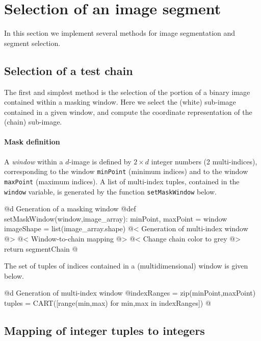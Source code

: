 \documentclass[11pt,oneside]{article}	%
\begin{document}
\section{Selection of an image segment}

In this section we implement several methods for image segmentation and segment selection. 

\subsection{Selection of a test chain}

The first and simplest method is the selection of the portion of a binary image contained within a masking window.
Here we select the (white) sub-image contained in a given window, and compute the coordinate representation of the (chain) sub-image.

\paragraph{Mask definition}

A \emph{window} within a $d$-image is defined by $2\times d$ integer numbers (2 multi-indices), corresponding to the window  \texttt{minPoint} (minimum indices) and to the window \texttt{maxPoint} (maximum indices). A list of multi-index tuples, contained in the \texttt{window} variable, is generated by the function \texttt{setMaskWindow} below.

@d Generation of a masking window
@{def setMaskWindow(window,image_array):
	minPoint, maxPoint = window
	imageShape = list(image_array.shape)
	@< Generation of multi-index window @>
	@< Window-to-chain mapping @>
	@< Change chain color to grey @>
	return segmentChain
@}

The set of tuples of indices contained in a (multidimensional) window is given below.
 
@d Generation of multi-index window
@{indexRanges = zip(minPoint,maxPoint)
tuples = CART([range(min,max) for min,max in indexRanges])
@}



\subsection{Mapping of integer tuples to integers}
\end{document}
